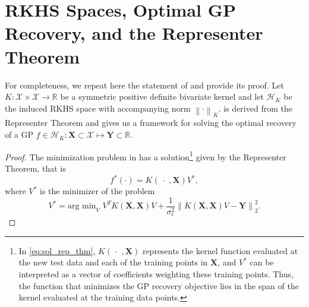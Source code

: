 \documentclass{article}
\theoremstyle{definition}
\theoremstyle{remark}
\newcommand{\R}{\mathbb{R}}
\newcommand{\norm}[1]{\left \lVert #1 \right \rVert}
\newcommand{\argmin}{\text{arg min}}
\begin{document}
\section{RKHS Spaces, Optimal GP Recovery, and the Representer Theorem}\label{app:RKHS}
For completeness, we repeat here the statement of  and provide its proof. Let $K: \mathcal{X} \times \mathcal{X} \rightarrow \R$ be a symmetric positive definite bivariate kernel and let $\mathcal{H}_K$ be the induced RKHS space with accompanying norm $\norm{\cdot}_K$.  is derived from the Representer Theorem and gives us a framework for solving the optimal recovery of a GP $f \in \mathcal{H}_K : \mathbf{X} \subset \mathcal{X} \mapsto \mathbf{Y} \subset \R$. 
\representer*
\begin{proof}
The minimization problem in  has a solution\footnote{In \eqref{eq:sol_rep_thm}, $K\left(\,\cdot\,\,, \mathbf{X} \right)$ represents the kernel function evaluated at the new test data and each of the training points in $\mathbf{X}$, and $V^*$ can be interpreted as a vector of coefficients weighting these training points. Thus, the function that minimizes the GP recovery objective lies in the span of the kernel evaluated at the training data points.} given by the Representer Theorem, that is
\begin{equation}\label{eq:sol_rep_thm}
f^*(\cdot) = K\left(\,\cdot\,\,, \mathbf{X} \right) V^*,
\end{equation}
where $V^*$ is the minimizer of  the problem
\begin{equation}
	V^* = \argmin_{V} \,\,  V^T K\left(\mathbf{X}, \mathbf{X} \right) V + \frac{1}{\sigma_{\epsilon}^2} \norm{K\left( \mathbf{X}, \mathbf{X} \right) V - \mathbf{Y}}_2^2.
\end{equation}



\end{proof}
\end{document}
